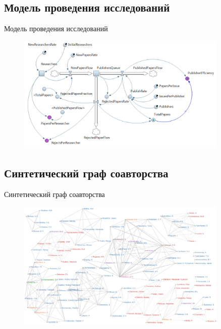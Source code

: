 \documentclass{beamer}
\begin{document}
\subsection{Модель проведения исследований}
\begin{frame}{Модель проведения исследований}
	\begin{figure}[ht]
		\centering
		\includegraphics[width=0.9\textwidth]{media/om6}
	\end{figure}  
\end{frame}



\subsection{Синтетический граф соавторства}
\begin{frame}{Синтетический граф соавторства}
	\begin{figure}[ht]
		\centering
		\includegraphics[width=0.9\textwidth]{media/so3}
	\end{figure}  
\end{frame}
\end{document}
